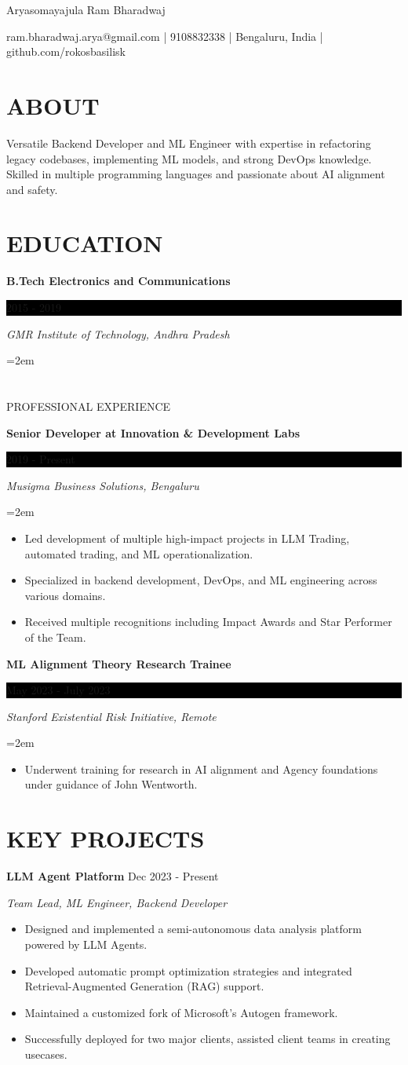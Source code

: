 \documentclass[fontsize=11pt]{article}
\newcommand{\sepspace}{\vspace*{1em}}
\newcommand{\MyName}[1]{
    \Huge \usefont{OT1}{phv}{b}{n} \hfill #1
    \par \normalsize \normalfont}
\newcommand{\NewPart}[1]{\section*{\uppercase{#1}}}
\newcommand{\EducationEntry}[4]{
    \noindent \textbf{#1} \hfill
    \colorbox{Black}{\parbox{8.5em}{\hfill\color{White}#2}} \par
    \noindent \textit{#3} \par
    \noindent\hangindent=2em\hangafter=0 \small #4
    \normalsize \par}
\newcommand{\WorkEntry}[4]{
    \noindent \textbf{#1} \hfill
    \colorbox{Black}{\parbox{9em}{\hfill\color{White}#2}} \par
    \noindent \textit{#3} \par
    \noindent\hangindent=2em\hangafter=0 \small #4
    \normalsize \par}
\newcommand{\ProjectEntry}[4]{
    \noindent \textbf{#1} \hfill {#2} \par
    \noindent \textit{#3} \par
    \noindent \small #4
    \normalsize \par}
\newcommand{\AboutEntry}[1]{
    \noindent #1 \par}
\begin{document}
\MyName{Aryasomayajula Ram Bharadwaj}
\bigskip

{\small \hfill ram.bharadwaj.arya@gmail.com | 9108832338 | Bengaluru, India | github.com/rokosbasilisk}

\NewPart{ABOUT}
\AboutEntry{Versatile Backend Developer and ML Engineer with expertise in refactoring legacy codebases, implementing ML models, and strong DevOps knowledge. Skilled in multiple programming languages and passionate about AI alignment and safety.}

\NewPart{EDUCATION}
\EducationEntry
{B.Tech Electronics and Communications}
{2015 - 2019}
{GMR Institute of Technology, Andhra Pradesh}

\NewPart{PROFESSIONAL EXPERIENCE}

\WorkEntry
{Senior Developer at Innovation \& Development Labs}
{2019 - Present}
{Musigma Business Solutions, Bengaluru}
{%
\begin{itemize}
\item Led development of multiple high-impact projects in LLM Trading, automated trading, and ML operationalization.
\item Specialized in backend development, DevOps, and ML engineering across various domains.
\item Received multiple recognitions including Impact Awards and Star Performer of the Team.
\end{itemize}}

\sepspace

\WorkEntry
{ML Alignment Theory Research Trainee}
{May 2023 - July 2023}
{Stanford Existential Risk Initiative, Remote}
{%
\begin{itemize}
    \item Underwent training for research in AI alignment and Agency foundations under guidance of John Wentworth.
\end{itemize}}

\NewPart{KEY PROJECTS}

\ProjectEntry{LLM Agent Platform}{Dec 2023 - Present}{Team Lead, ML Engineer, Backend Developer}
{%
\begin{itemize}
\item Designed and implemented a semi-autonomous data analysis platform powered by LLM Agents.
\item Developed automatic prompt optimization strategies and integrated Retrieval-Augmented Generation (RAG) support.
\item Maintained a customized fork of Microsoft's Autogen framework.
\item Successfully deployed for two major clients, assisted client teams in creating usecases.
\end{itemize}}
\end{document}
